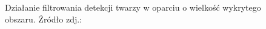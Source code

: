 \begin{itemize}
\begin{figure}[!h]
\begin{center}
        \end{center}
        \caption{Działanie filtrowania detekcji twarzy w oparciu o wielkość wykrytego obszaru. Źródło zdj.: \cite{readheadPortrait1}}
        \label{fig:face_size}
    \end{figure}
    
    
    
\end{itemize}